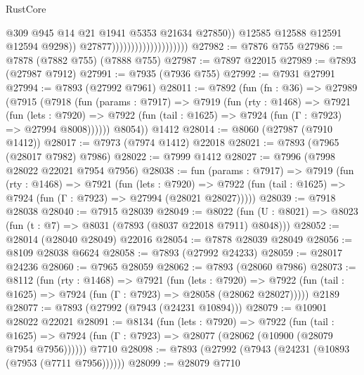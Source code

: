 \begin{lexlean}{RustCore}
\begin{coremodule}
                                                    @309
                                                    @945
                                                    @14
                                                    @21
                                                    @1941
                                                    @5353
                                                    @21634
                                                    @27850))
                                                @12585
                                                @12588
                                                @12591
                                                @12594
                                                @9298))
                                            @27877))))))))))))))))))))
@27982 := @7876 @755
@27986 := @7878 (@7882 @755) (@7888 @755)
@27987 := @7897 @22015
@27989 := @7893 (@27987 @7912)
@27991 := @7935 (@7936 @755)
@27992 := @7931 @27991
@27994 := @7893 (@27992 @7961)
@28011 := @7892
    (fun (fn : @36) =>
    @27989
      (@7915
        (@7918
          (fun (params : @7917) =>
          @7919
            (fun (rty : @1468) =>
            @7921
              (fun (lets : @7920) =>
              @7922 (fun (tail : @1625) => @7924 (fun (Γ : @7923) => @27994 @8008))))))
        @8054))
    @1412
@28014 := @8060 (@27987 (@7910 @1412))
@28017 := @7973 (@7974 @1412) @22018
@28021 := @7893 (@7965 (@28017 @7982) @7986)
@28022 := @7999 @1412
@28027 := @7996 (@7998 @28022 @22021 @7954 @7956)
@28038 := fun (params : @7917) =>
  @7919
    (fun (rty : @1468) =>
    @7921
      (fun (lets : @7920) =>
      @7922 (fun (tail : @1625) => @7924 (fun (Γ : @7923) => @27994 (@28021 @28027)))))
@28039 := @7918 @28038
@28040 := @7915 @28039
@28049 := @8022
    (fun (U : @8021) => @8023 (fun (t : @7) => @8031 (@7893 (@8037 @22018 @7911) @8048)))
@28052 := @28014 (@28040 @28049) @22016
@28054 := @7878 @28039 @28049
@28056 := @8109 @28038 @6624
@28058 := @7893 (@27992 @24233)
@28059 := @28017 @24236
@28060 := @7965 @28059
@28062 := @7893 (@28060 @7986)
@28073 := @8112
    (fun (rty : @1468) =>
    @7921
      (fun (lets : @7920) =>
      @7922 (fun (tail : @1625) => @7924 (fun (Γ : @7923) => @28058 (@28062 @28027)))))
    @2189
@28077 := @7893 (@27992 (@7943 (@24231 @10894)))
@28079 := @10901 @28022 @22021
@28091 := @8134
    (fun (lets : @7920) =>
    @7922
      (fun (tail : @1625) =>
      @7924 (fun (Γ : @7923) => @28077 (@28062 (@10900 (@28079 @7954 @7956))))))
    @7710
@28098 := @7893 (@27992 (@7943 (@24231 (@10893 (@7953 (@7711 @7956))))))
@28099 := @28079 @7710

\end{coremodule}
\end{lexlean}
